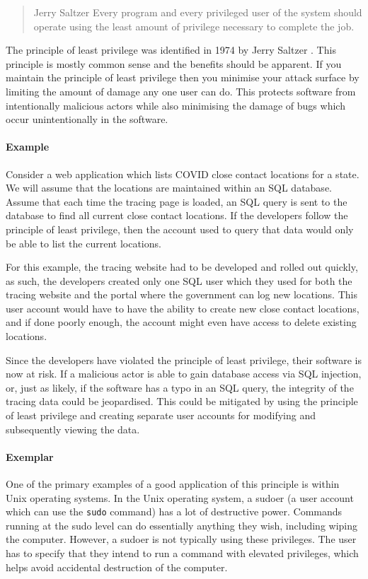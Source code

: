 \begin{quote}{Jerry Saltzer \cite{least-privilege}}
Every program and every privileged user of the system should operate using the least amount of privilege necessary to complete the job.
\end{quote}

\noindent The principle of least privilege was identified in 1974 by Jerry Saltzer \cite{least-privilege}.
This principle is mostly common sense and the benefits should be apparent.
If you maintain the principle of least privilege then you minimise your attack surface by limiting the amount of damage any one user can do.
This protects software from intentionally malicious actors while also minimising the damage of bugs which occur unintentionally in the software.

\paragraph{Example}
Consider a web application which lists COVID close contact locations for a state.
We will assume that the locations are maintained within an SQL database.
Assume that each time the tracing page is loaded, an SQL query is sent to the database to find all current close contact locations.
If the developers follow the principle of least privilege, then the account used to query that data would only be able to list the current locations.

For this example, the tracing website had to be developed and rolled out quickly, as such,
the developers created only one SQL user which they used for both the tracing website and the portal where the government can log new locations.
This user account would have to have the ability to create new close contact locations, and if done poorly enough,
the account might even have access to delete existing locations.

Since the developers have violated the principle of least privilege,
their software is now at risk.
If a malicious actor is able to gain database access via SQL injection, or,
just as likely, if the software has a typo in an SQL query, the integrity of the tracing data could be jeopardised.
This could be mitigated by using the principle of least privilege and creating separate user accounts for modifying and subsequently viewing the data.

\paragraph{Exemplar}
One of the primary examples of a good application of this principle is within Unix operating systems.
In the Unix operating system, a sudoer (a user account which can use the \texttt{sudo} command) has a lot of destructive power.
Commands running at the sudo level can do essentially anything they wish, including wiping the computer.
However, a sudoer is not typically using these privileges.
The user has to specify that they intend to run a command with elevated privileges,
which helps avoid accidental destruction of the computer.

